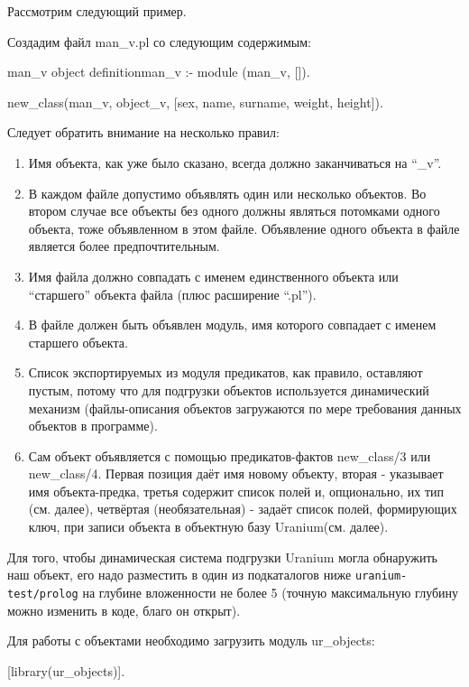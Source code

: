 \documentclass[a4paper]{book}
\def\ur{Uranium}
\begin{document}
Рассмотрим следующий пример.

Создадим файл man\_v.pl со следующим содержимым:

\begin{example}{man\_v object definition}{man_v}
:- module (man_v, []).

new_class(man_v, object_v, [sex, name, surname, weight, height]).
\end{example}

Следует обратить внимание на несколько правил:

\begin{enumerate}
\item Имя объекта, как уже было сказано, всегда должно заканчиваться
на ``\_v''. 
\item В каждом файле допустимо объявлять один или несколько
объектов. Во втором случае все объекты без одного должны являться
потомками одного объекта, тоже объявленном в этом
файле. Объявление одного объекта в файле является более
предпочтительным.
\item Имя файла должно совпадать с именем единственного объекта или
``старшего'' объекта файла (плюс расширение ``.pl'').
\item В файле должен быть объявлен модуль, имя которого совпадает с
именем старшего объекта.
\item Список экспортируемых из модуля предикатов, как правило,
оставляют пустым, потому что для подгрузки объектов используется
динамический механизм (файлы-описания объектов загружаются по
мере требования данных объектов в программе).
\item Сам объект объявляется с помощью предикатов-фактов
new\_class/3 или new\_class/4. Первая позиция даёт имя новому
объекту, вторая - указывает имя объекта-предка, третья содержит
список полей и, опционально, их тип (см. далее), четвёртая
(необязательная) - задаёт список полей, формирующих ключ, при
записи объекта в объектную базу \ur (см. далее).
\end{enumerate}

Для того, чтобы динамическая система подгрузки \ur{} могла
обнаружить наш объект, его надо разместить в один из подкаталогов
ниже \verb|uranium-test/prolog| на глубине вложенности не более 5
(точную максимальную глубину можно изменить в коде, благо он
открыт). 

Для работы с объектами необходимо загрузить модуль ur\_objects:

\begin{example}{}{}
[library(ur_objects)].
\end{example}
\end{document}
